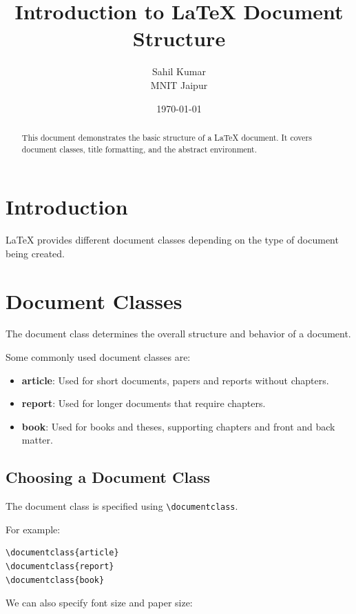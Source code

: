 \documentclass[12pt,a4paper]{article}
\title{\Huge\bfseries Introduction to LaTeX Document Structure}
\author{
    Sahil Kumar \\
    \small MNIT Jaipur
}
\date{\today}
\begin{document}
\maketitle

\begin{abstract}
This document demonstrates the basic structure of a
LaTeX document. It covers document classes, title
formatting, and the abstract environment.
\end{abstract}

\section{Introduction}

LaTeX provides different document classes depending
on the type of document being created.

\section{Document Classes}

The document class determines the overall structure
and behavior of a document.

Some commonly used document classes are:

\begin{itemize}
    \item \textbf{article}: Used for short documents,
    papers and reports without chapters.

    \item \textbf{report}: Used for longer documents
    that require chapters.

    \item \textbf{book}: Used for books and theses,
    supporting chapters and front and back matter.
\end{itemize}

\subsection{Choosing a Document Class}

The document class is specified using
\texttt{\textbackslash documentclass}.

For example:

\begin{verbatim}
\documentclass{article}
\documentclass{report}
\documentclass{book}
\end{verbatim}

We can also specify font size and paper size:
\end{document}
